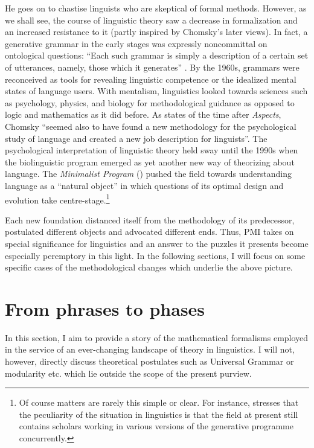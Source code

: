 \documentclass[output=paper]{langscibook}
\begin{document}
He goes on to chastise linguists who are skeptical of formal methods. However, as we shall see, the course of linguistic theory saw a decrease in formalization and an increased resistance to it (partly inspired by Chomsky's later views). In fact, a generative grammar in the early stages was expressly noncommittal on ontological questions: ``Each such grammar is simply a description of a certain set of utterances, namely, those which it generates'' \citep[48]{Chomsky1957}. By the 1960s, grammars were reconceived as tools for revealing linguistic competence or the idealized mental states of language users. With mentalism, linguistics looked towards sciences such as psychology, physics, and biology for methodological guidance as opposed to logic and mathematics as it did before. As \cite[167]{Cowie1999} states of the time after \emph{Aspects}, Chomsky ``seemed also to have found a new methodology for the psychological study of language and created a new job description for linguists''. The psychological interpretation of linguistic theory held sway until the 1990s when the biolinguistic program emerged as yet another new way of theorizing about language. The \emph{Minimalist Program} (\citeyear{Chomsky1995MP}) pushed the field towards understanding language as a ``natural object'' in which questions of its optimal design and evolution take centre-stage.\footnote{Of course matters are rarely this simple or clear. For instance, \cite{Bickerton2014} stresses that the peculiarity of the situation in linguistics is that the field at present still contains scholars working in various versions of the generative programme concurrently.}

Each new foundation distanced itself from the methodology of its predecessor, postulated different objects and advocated different ends. Thus, PMI takes on special significance for linguistics and an answer to the puzzles it presents become especially peremptory in this light. In the following sections, I will focus on some specific cases of the methodological changes which underlie the above picture. 


\section{From phrases to phases}
\label{sec:nefdt:phrasephase}

In this section, I aim to provide a story of the mathematical formalisms employed in the service of an ever-changing landscape of theory in linguistics. I will not, however, directly discuss theoretical postulates such as Universal Grammar or modularity etc. which lie outside the scope of the present purview.
\end{document}

